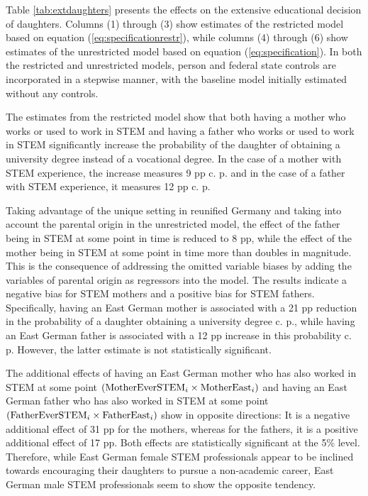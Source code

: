 \documentclass[a4paper, oneside, hyperfootnotes = false]{article}
\begin{document}
{Table \ref{tab:extdaughters} presents the effects on the extensive educational decision of daughters.
Columns (1) through (3) show estimates of the restricted model based on equation (\ref{eq:specificationrestr}), while columns (4) through (6) show estimates of the unrestricted model based on equation (\ref{eq:specification}).
In both the restricted and unrestricted models, person and federal state controls are incorporated in a stepwise manner, with the baseline model initially estimated without any controls.

The estimates from the restricted model show that both having a mother who works or used to work in STEM and having a father who works or used to work in STEM significantly increase the probability of the daughter of obtaining a university degree instead of a vocational degree.
In the case of a mother with STEM experience, the increase measures 9 pp c. p. and in the case of a father with STEM experience, it measures 12 pp c. p.

Taking advantage of the unique setting in reunified Germany and taking into account the parental origin in the unrestricted model, the effect of the father being in STEM at some point in time is reduced to 8 pp, while the effect of the mother being in STEM at some point in time more than doubles in magnitude.
This is the consequence of addressing the omitted variable biases by adding the variables of parental origin as regressors into the model.
The results indicate a negative bias for STEM mothers and a positive bias for STEM fathers.
Specifically, having an East German mother is associated with a 21 pp reduction in the probability of a daughter obtaining a university degree c. p., while having an East German father is associated with a 12 pp increase in this probability c. p.
However, the latter estimate is not statistically significant.

The additional effects of having an East German mother who has also worked in STEM at some point $(\textnormal{MotherEverSTEM}_{i} \times \textnormal{MotherEast}_{i})$  and having an East German father who has also worked in STEM at some point $(\textnormal{FatherEverSTEM}_{i} \times \textnormal{FatherEast}_{i})$ show in opposite directions:
It is a negative additional effect of 31 pp for the mothers, whereas for the fathers, it is a positive additional effect of 17 pp.
Both effects are statistically significant at the 5\% level.
Therefore, while East German female STEM professionals appear to be inclined towards encouraging their daughters to pursue a non-academic career, East German male STEM professionals seem to show the opposite tendency.

}
\end{document}
